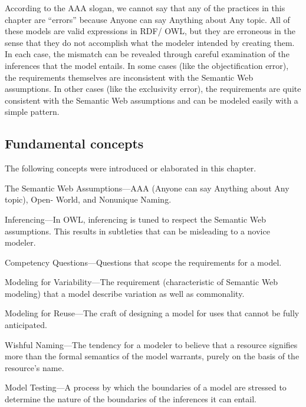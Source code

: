 According to the AAA slogan, we cannot say that any of the practices in
this chapter are ``errors'' because Anyone can say Anything about Any
topic. All of these models are valid expressions in RDF/ OWL, but they
are erroneous in the sense that they do not accomplish what the modeler
intended by creating them. In each case, the mismatch can be revealed
through careful examination of the inferences that the model entails. In
some cases (like the objectification error), the requirements themselves
are inconsistent with the Semantic Web assumptions. In other cases (like
the exclusivity error), the requirements are quite consistent with the
Semantic Web assumptions and can be modeled easily with a simple
pattern.

\subsection{Fundamental concepts}

The following concepts were introduced or elaborated in this chapter.

The Semantic Web Assumptions---AAA (Anyone can say Anything about Any
topic), Open- World, and Nonunique Naming.

Inferencing---In OWL, inferencing is tuned to respect the Semantic Web
assumptions. This results in subtleties that can be misleading to a
novice modeler.

Competency Questions---Questions that scope the requirements for a
model.

Modeling for Variability---The requirement (characteristic of Semantic
Web modeling) that a model describe variation as well as commonality.

Modeling for Reuse---The craft of designing a model for uses that cannot
be fully anticipated.

Wishful Naming---The tendency for a modeler to believe that a resource
signifies more than the formal semantics of the model warrants, purely
on the basis of the resource's name.

Model Testing---A process by which the boundaries of a model are
stressed to determine the nature of the boundaries of the inferences it
can entail.

